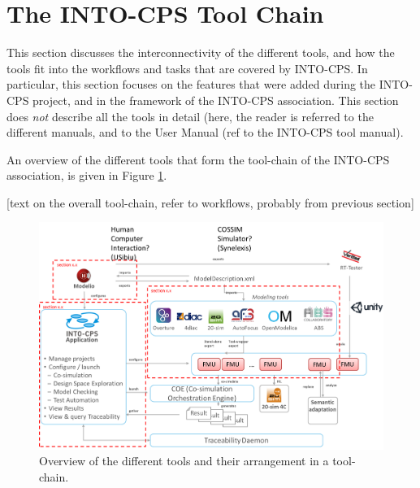 
\section{The INTO-CPS Tool Chain}\label{sec:toolchain}




This section discusses the interconnectivity of the different tools, and how the tools fit into the workflows and tasks that are covered by INTO-CPS. In particular, this section focuses on the features that were added during the INTO-CPS project, and in the framework of the INTO-CPS association. This section does \textit{not} describe all the tools in detail (here, the reader is referred to the different manuals, and to the User Manual (ref to the INTO-CPS tool manual).

An overview of the different tools that form the tool-chain of the INTO-CPS association, is given in Figure \ref{fig:tool-chain}.

[text on the overall tool-chain, refer to workflows, probably from previous section]

\begin{figure}[!ht]
	\centering
		\includegraphics[width=0.9 \textwidth]{../figures/toolchain_association}
	\caption{Overview of the different tools and their arrangement in a tool-chain.}
	\label{fig:tool-chain}
\end{figure}

